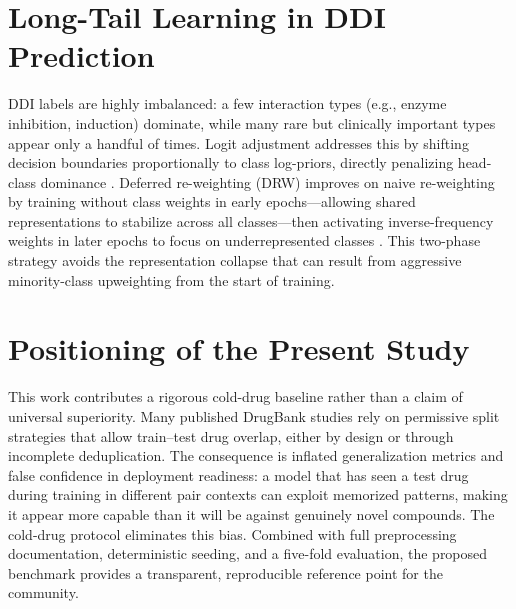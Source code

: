 \documentclass[11pt,a4paper]{report}
\begin{document}
\section{Long-Tail Learning in DDI Prediction}

DDI labels are highly imbalanced: a few interaction types (e.g., enzyme inhibition, induction) dominate, while many rare but clinically important types appear only a handful of times. Logit adjustment addresses this by shifting decision boundaries proportionally to class log-priors, directly penalizing head-class dominance \cite{menon2021logit}. Deferred re-weighting (DRW) improves on naive re-weighting by training without class weights in early epochs---allowing shared representations to stabilize across all classes---then activating inverse-frequency weights in later epochs to focus on underrepresented classes \cite{cao2019ldam}. This two-phase strategy avoids the representation collapse that can result from aggressive minority-class upweighting from the start of training.

\section{Positioning of the Present Study}

This work contributes a rigorous cold-drug baseline rather than a claim of universal superiority. Many published DrugBank studies rely on permissive split strategies that allow train--test drug overlap, either by design or through incomplete deduplication. The consequence is inflated generalization metrics and false confidence in deployment readiness: a model that has seen a test drug during training in different pair contexts can exploit memorized patterns, making it appear more capable than it will be against genuinely novel compounds. The cold-drug protocol eliminates this bias. Combined with full preprocessing documentation, deterministic seeding, and a five-fold evaluation, the proposed benchmark provides a transparent, reproducible reference point for the community.
\end{document}
